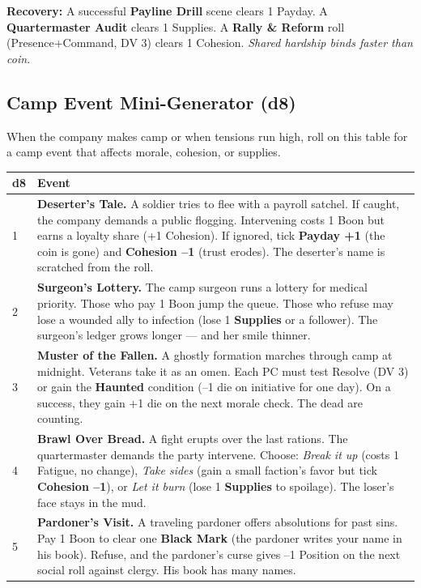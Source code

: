 \textbf{Recovery:} A successful \textbf{Payline Drill} scene clears 1 Payday. A \textbf{Quartermaster Audit} clears 1 Supplies. A \textbf{Rally \& Reform} roll (Presence+Command, DV 3) clears 1 Cohesion. \textit{Shared hardship binds faster than coin.}

\subsection*{Camp Event Mini-Generator (d8)}
\label{sec:black-banners-camp-events}

When the company makes camp or when tensions run high, roll on this table for a camp event that affects morale, cohesion, or supplies.

\begin{longtable}{|p{}|p{}|}
\hline
\textbf{d8} & \textbf{Event} \\
\hline
1 & \textbf{Deserter's Tale.} A soldier tries to flee with a payroll satchel. If caught, the company demands a public flogging. Intervening costs 1 Boon but earns a loyalty share (+1 Cohesion). If ignored, tick \textbf{Payday +1} (the coin is gone) and \textbf{Cohesion --1} (trust erodes). The deserter's name is scratched from the roll. \\
\hline
2 & \textbf{Surgeon's Lottery.} The camp surgeon runs a lottery for medical priority. Those who pay 1 Boon jump the queue. Those who refuse may lose a wounded ally to infection (lose 1 \textbf{Supplies} or a follower). The surgeon's ledger grows longer --- and her smile thinner. \\
\hline
3 & \textbf{Muster of the Fallen.} A ghostly formation marches through camp at midnight. Veterans take it as an omen. Each PC must test Resolve (DV 3) or gain the \textbf{Haunted} condition (--1 die on initiative for one day). On a success, they gain +1 die on the next morale check. The dead are counting. \\
\hline
4 & \textbf{Brawl Over Bread.} A fight erupts over the last rations. The quartermaster demands the party intervene. Choose: \textit{Break it up} (costs 1 Fatigue, no change), \textit{Take sides} (gain a small faction's favor but tick \textbf{Cohesion --1}), or \textit{Let it burn} (lose 1 \textbf{Supplies} to spoilage). The loser's face stays in the mud. \\
\hline
5 & \textbf{Pardoner's Visit.} A traveling pardoner offers absolutions for past sins. Pay 1 Boon to clear one \textbf{Black Mark} (the pardoner writes your name in his book). Refuse, and the pardoner's curse gives --1 Position on the next social roll against clergy. His book has many names. \\

\end{longtable}

